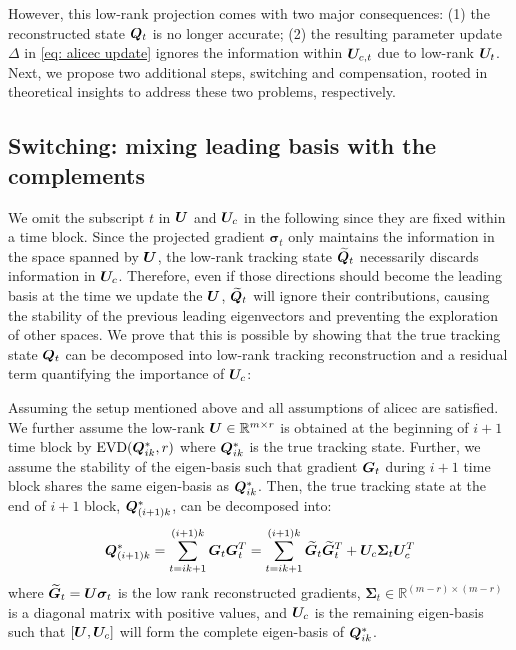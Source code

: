 However, this low-rank projection comes with two major consequences: (1) the reconstructed state ${\bm{Q}}_t$ is no longer accurate; (2) the resulting parameter update $\Delta$ in \cref{eq: alicec update} ignores the information within ${\bm{U}}_{c,t}$ due to low-rank ${\bm{U}}_t$. Next, we propose two additional steps, switching and compensation, rooted in theoretical insights to address these two problems, respectively.


\subsection{Switching: mixing leading basis with the complements}
\label{subsec: switching}
We omit the subscript $t$ in ${\bm{U}}$ and ${\bm{U}}_c$ in the following since they are fixed within a time block. 
Since the projected gradient $\bm{\sigma}_t$ only maintains the information in the space spanned by ${\bm{U}}$, the low-rank tracking state $\widetilde{{\bm{Q}}}_t$ necessarily discards information in ${\bm{U}}_{c}$. Therefore, even if those directions should become the leading basis at the time we update the ${\bm{U}}$, $\widetilde{{\bm{Q}}}_t$ will ignore their contributions, causing the stability of the previous leading eigenvectors and preventing the exploration of other spaces. We prove that this is possible by showing that the true tracking state ${\bm{Q}}_t$ can be decomposed into low-rank tracking reconstruction and a residual term quantifying the importance of ${\bm{U}}_{c}$:
\begin{proposition}
    Assuming the setup mentioned above and all assumptions of \gls{alicec} are satisfied. We further assume the low-rank ${\bm{U}}\in\mathbb{R}^{m\times r}$ is obtained at the beginning of $i+1$ time block by $\operatorname{EVD}({\bm{Q}}^*_{ik},r)$ where ${\bm{Q}}^*_{ik}$ is the true tracking state. Further, we assume the stability of the eigen-basis such that gradient ${\bm{G}}_t$ during $i+1$ time block shares the same eigen-basis as ${\bm{Q}}^*_{ik}$. Then, the true tracking state at the end of $i+1$ block, ${\bm{Q}}^*_{(i+1)k}$, can be decomposed into:
    \begin{align}
        {\bm{Q}}^*_{(i+1)k}=\sum_{t=ik+1}^{(i+1)k} {\bm{G}}_t{\bm{G}}_t^T = \sum_{t=ik+1}^{(i+1)k} \widetilde{{\bm{G}}}_t\widetilde{{\bm{G}}}_t^T+{\bm{U}}_c\bm{\Sigma}_t{\bm{U}}_c^T
        \label{eq: what is happening with low-rank U}
    \end{align}
    where $\widetilde{{\bm{G}}}_t={\bm{U}}\bm{\sigma}_t$ is the low rank reconstructed gradients, $\bm{\Sigma}_t\in\mathbb{R}^{(m-r)\times (m-r)}$ is a diagonal matrix with positive values, and ${\bm{U}}_c$ is the remaining eigen-basis such that $[{\bm{U}},{\bm{U}}_c]$ will form the complete eigen-basis of ${\bm{Q}}^*_{ik}$. 
    \label{prop: subspace switching}
\end{proposition}

